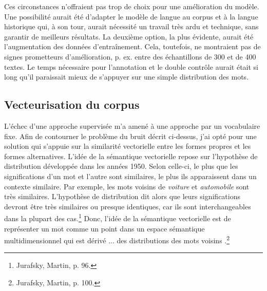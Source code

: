 \documentclass[a4paper,twoside,12pt]{article}
\begin{document}
Ces circonstances n'offraient pas trop de choix pour une amélioration du modèle. Une possibilité aurait été d'adapter le modèle de langue au corpus et à la langue historique qui, à son tour, aurait nécessité un travail très ardu et technique, sans garantir de meilleurs résultats. La deuxième option, la plus évidente, aurait été l'augmentation des données d'entraînement. Cela, toutefois, ne montraient pas de signes prometteurs d'amélioration, p. ex. entre des échantillons de 300 et de 400 textes. Le temps nécessaire pour l'annotation et le double contrôle aurait était si long qu'il paraissait mieux de s'appuyer sur une simple distribution des mots.


\subsection{Vecteurisation du corpus} \label{entity_ruler}

L'échec d'une approche supervisée m'a amené à une approche par un vocabulaire fixe. Afin de contourner le problème du bruit décrit ci-dessus, j'ai opté pour une solution qui s'appuie sur la similarité vectorielle entre les formes \og propres \fg{} et les formes alternatives. L'idée de la sémantique vectorielle repose sur l'hypothèse de distribution développée dans les années 1950. Selon celle-ci, le plus que les significations d'un mot et l'autre sont similaires, le plus ils apparaissent dans un contexte similaire. Par exemple, les mots voisins de \textit{voiture} et \textit{automobile} sont très similaires. L'hypothèse de distribution dit alors que leurs significations devront être très similaires ou presque identiques, car ils sont interchangeables dans la plupart des cas.\footnote{Jurafsky, Martin, p. 96.} Donc, \og l'idée de la sémantique vectorielle est de représenter un mot comme un point dans un espace sémantique multidimensionnel qui est dérivé ... des distributions des mots voisins \fg{}.\footnote{Jurafsky, Martin, p. 100.}
\end{document}
